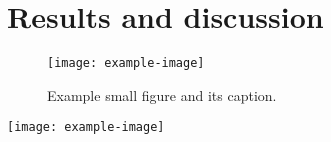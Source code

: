 

\section{Results and discussion}

\begin{figure}[htb]
    \centering
    \texttt{[image: example-image]}
    \caption{%
        Example small figure and its caption.
    }\label{fig:caption-1}
\end{figure}

\lipsum[1-6]{}

\begin{widefigure}[htb]
    \centering
    \texttt{[image: example-image]}
    \caption{%
        Example twocolumn large figure.
    }\label{fig:caption-2}
\end{widefigure}

\lipsum[2-4]{}